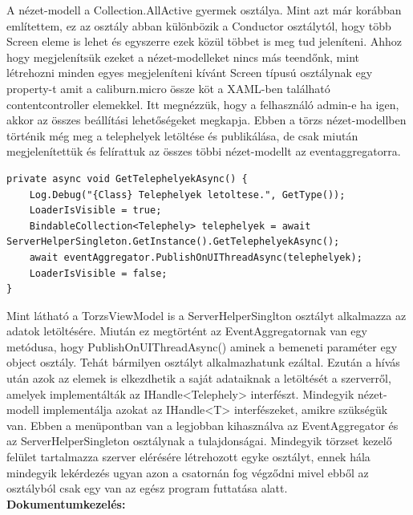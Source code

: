 \documentclass[
]{thesis-ekf}
\theoremstyle{definition}
\theoremstyle{remark}
\begin{document}
A nézet-modell a Collection.AllActive gyermek osztálya. Mint azt már korábban említettem, ez az osztály abban különbözik a Conductor osztálytól, hogy több Screen eleme is lehet és egyszerre ezek közül többet is meg tud jeleníteni. Ahhoz hogy megjelenítsük ezeket a nézet-modelleket nincs más teendőnk, mint létrehozni minden egyes megjeleníteni kívánt Screen típusú osztálynak egy property-t amit a caliburn.micro össze köt a XAML-ben található contentcontroller elemekkel. Itt megnézzük, hogy a felhasználó admin-e ha igen, akkor az összes beállítási lehetőségeket megkapja. Ebben a törzs nézet-modellben történik még meg a telephelyek letöltése és publikálása, de csak miután megjelenítettük és felírattuk az összes többi nézet-modellt az eventaggregatorra. 
\begin{lstlisting}[showstringspaces=false,caption={Telephelyek letöltése a törzs adatok számára.},captionpos=b]
private async void GetTelephelyekAsync() {
	Log.Debug("{Class} Telephelyek letoltese.", GetType());
	LoaderIsVisible = true;
	BindableCollection<Telephely> telephelyek = await 	ServerHelperSingleton.GetInstance().GetTelephelyekAsync();
	await eventAggregator.PublishOnUIThreadAsync(telephelyek);
	LoaderIsVisible = false;
}
\end{lstlisting}

Mint látható a TorzsViewModel is a ServerHelperSinglton osztályt alkalmazza az adatok letöltésére. Miután ez megtörtént az EventAggregatornak van egy metódusa, hogy PublishOnUIThreadAsync() aminek a bemeneti paraméter egy object osztály. Tehát bármilyen osztályt alkalmazhatunk ezáltal. Ezután a hívás után azok az elemek is elkezdhetik a saját adataiknak a letöltését a szerverről, amelyek implementálták az IHandle<Telephely> interfészt. Mindegyik nézet-modell implementálja azokat az IHandle<T> interfészeket, amikre szükségük van. Ebben a menüpontban van a legjobban kihasználva az EventAggregator és az ServerHelperSingleton osztálynak a tulajdonságai.  Mindegyik törzset kezelő felület tartalmazza szerver elérésére létrehozott egyke osztályt, ennek hála mindegyik lekérdezés ugyan azon a csatornán fog végződni mivel ebből az osztályból csak egy van az egész program futtatása alatt. \\

\textbf{Dokumentumkezelés:}
\end{document}
